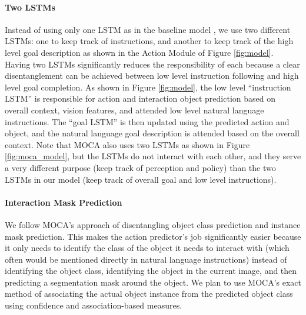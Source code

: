 \documentclass[11pt,a4paper]{article}
\begin{document}
\paragraph{Two LSTMs}
Instead of using only one LSTM as in the baseline model \cite{shridhar2020alfred}, we use two different LSTMs: one to keep track of instructions, and another to keep track of the high level goal description as shown in the Action Module of Figure \ref{fig:model}. Having two LSTMs significantly reduces the responsibility of each because a clear disentanglement can be achieved between low level instruction following and high level goal completion. As shown in Figure \ref{fig:model}, the low level ``instruction LSTM'' is responsible for action and interaction object prediction based on overall context, vision features, and attended low level natural language instructions. The ``goal LSTM'' is then updated using the predicted action and object, and the natural language goal description is attended based on the overall context. Note that MOCA also uses two LSTMs as shown in Figure \ref{fig:moca_model}, but the LSTMs do not interact with each other, and they serve a very different purpose (keep track of perception and policy) than the two LSTMs in our model (keep track of overall goal and low level instructions).

\paragraph{Interaction Mask Prediction}
We follow MOCA's \cite{singh2020moca} approach of disentangling object class prediction and instance mask prediction. This makes the action predictor's job significantly easier because it only needs to identify the class of the object it needs to interact with (which often would be mentioned directly in natural language instructions) instead of identifying the object class, identifying the object in the current image, and then predicting a segmentation mask around the object. We plan to use MOCA's exact method of associating the actual object instance from the predicted object class using confidence and association-based measures.
\end{document}
